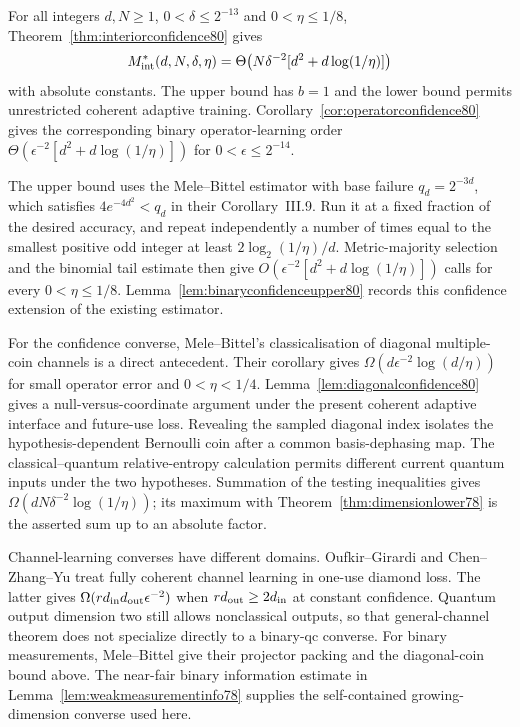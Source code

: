 For all integers $d,N\ge1$, $0<\delta\le2^{-13}$ and
$0<\eta\le1/8$, Theorem~\ref{thm:interiorconfidence80} gives
\[
 M^*_{\rm int}(d,N,\delta,\eta)
 =\Theta\!\left(N\delta^{-2}
             [d^2+d\log(1/\eta)]\right)
\]
with absolute constants.  The upper bound has $b=1$ and the lower
bound permits unrestricted coherent adaptive training.
Corollary~\ref{cor:operatorconfidence80} gives the corresponding
binary operator-learning order
$\Theta(\epsilon^{-2}[d^2+d\log(1/\eta)])$ for
$0<\epsilon\le2^{-14}$.

The upper bound uses the Mele--Bittel estimator with base failure
$q_d=2^{-3d}$, which satisfies $4e^{-4d^2}<q_d$ in their
Corollary~III.9.  Run it at a fixed fraction of the desired accuracy,
and repeat independently a number of times equal to the smallest
positive odd integer at least $2\log_2(1/\eta)/d$.  Metric-majority
selection and the binomial tail estimate then give
$O(\epsilon^{-2}[d^2+d\log(1/\eta)])$ calls for every
$0<\eta\le1/8$.  Lemma~\ref{lem:binaryconfidenceupper80}
records this confidence extension of the existing estimator.

For the confidence converse, Mele--Bittel's classicalisation of
diagonal multiple-coin channels
\cite[Lemma~IV.19 and Corollary~IV.20]{MB67} is a direct
antecedent.  Their corollary gives
$\Omega(d\epsilon^{-2}\log(d/\eta))$ for small operator error
and $0<\eta<1/4$.  Lemma~\ref{lem:diagonalconfidence80} gives a
null-versus-coordinate argument under the present coherent adaptive
interface and future-use loss.  Revealing the sampled diagonal
index isolates the hypothesis-dependent Bernoulli coin after a
common basis-dephasing map.  The classical--quantum relative-entropy
calculation permits different current quantum inputs under the
two hypotheses.  Summation of the testing inequalities gives
$\Omega(dN\delta^{-2}\log(1/\eta))$; its maximum with
Theorem~\ref{thm:dimensionlower78} is the asserted sum up to an
absolute factor.

Channel-learning converses have different domains.
Oufkir--Girardi \cite{OG67} and Chen--Zhang--Yu
\cite[Theorems~1.1 and~4.2]{CZY78} treat fully coherent channel
learning in one-use diamond loss.  The latter gives
$\Omega(rd_{\rm in}d_{\rm out}\epsilon^{-2})$ when
$rd_{\rm out}\ge2d_{\rm in}$ at constant confidence.  Quantum
output dimension two still allows nonclassical outputs, so that
general-channel theorem does not specialize directly to a
binary-qc converse.  For binary measurements, Mele--Bittel give
their projector packing \cite[Proposition~IV.17]{MB67} and the
diagonal-coin bound above.  The near-fair binary information
estimate in Lemma~\ref{lem:weakmeasurementinfo78} supplies the
self-contained growing-dimension converse used here.


